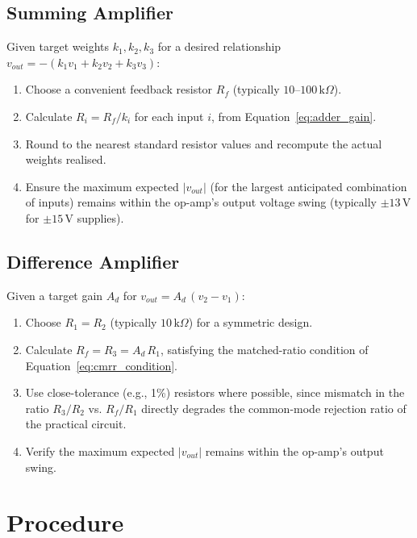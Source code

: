 \subsection{Summing Amplifier}
Given target weights $k_1, k_2, k_3$ for a desired relationship $v_{out} = -(k_1 v_1 + k_2 v_2 + k_3 v_3)$:
\begin{enumerate}[label=(\alph*)]
	\item Choose a convenient feedback resistor $R_f$ (typically $10$--$100\,\text{k}\Omega$).
	\item Calculate $R_i = R_f / k_i$ for each input $i$, from Equation~\eqref{eq:adder_gain}.
	\item Round to the nearest standard resistor values and recompute the actual weights realised.
	\item Ensure the maximum expected $|v_{out}|$ (for the largest anticipated combination of inputs) remains within the op-amp's output voltage swing (typically $\pm 13\,\text{V}$ for $\pm 15\,\text{V}$ supplies).
\end{enumerate}

\subsection{Difference Amplifier}
Given a target gain $A_d$ for $v_{out} = A_d\,(v_2 - v_1)$:
\begin{enumerate}[label=(\alph*)]
	\item Choose $R_1 = R_2$ (typically $10\,\text{k}\Omega$) for a symmetric design.
	\item Calculate $R_f = R_3 = A_d\, R_1$, satisfying the matched-ratio condition of Equation~\eqref{eq:cmrr_condition}.
	\item Use close-tolerance (e.g., 1\%) resistors where possible, since mismatch in the ratio $R_3/R_2$ vs. $R_f/R_1$ directly degrades the common-mode rejection ratio of the practical circuit.
	\item Verify the maximum expected $|v_{out}|$ remains within the op-amp's output swing.
\end{enumerate}

\section{Procedure}

